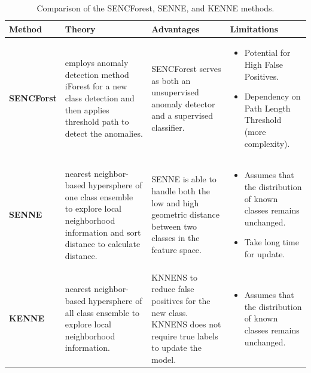 \begin{table}[!ht]

    \centering
    \caption{Comparison of the SENCForest, SENNE, and KENNE methods.}
    \label{table:emerging}
    \small %
    \renewcommand{\arraystretch}{1} %
    \setlength{\tabcolsep}{4pt} %
    \setlength{\arrayrulewidth}{0.15mm}
    \begin{tabularx}{\textwidth}{|>{\centering\arraybackslash\bfseries}p{2cm}|
                                       >{\raggedright\arraybackslash}X|
                                       >{\raggedright\arraybackslash}X|
                                       >{\raggedright\arraybackslash}X|}
    \hline
    \textbf{Method} & \textbf{Theory} & \textbf{Advantages} & \textbf{Limitations} \\ 
    \hline
    \textbf{SENCForst} & 
    employs anomaly detection method iForest \cite{wang2010negative} for a new class detection and then applies threshold path to detect the anomalies. & 
    SENCForest serves as both an unsupervised anomaly detector and a supervised classifier.&
    \begin{itemize}[leftmargin=*]
        \item Potential for High False Positives.
        \item Dependency on Path Length Threshold (more complexity).
    \end{itemize} \\ 
    \hline
    \textbf{SENNE} & 
    nearest neighbor-based hypersphere of one class ensemble to explore local neighborhood information and sort distance to calculate distance. & 
    SENNE is able to handle both the low and high geometric distance between two classes in the feature space. & 
    \begin{itemize}[leftmargin=*]
        \item Assumes that the distribution of known classes remains unchanged.
        \item Take long time for update.
    \end{itemize} \\ 
    \hline
    \textbf{KENNE} & 
    nearest neighbor-based hypersphere of all class ensemble to explore local neighborhood information. & 
    KNNENS to reduce false positives for the new class. KNNENS does not require true labels to update the model. & 
    \begin{itemize}[leftmargin=*]
        \item Assumes that the distribution of known classes remains unchanged.
    \end{itemize} \\
    \hline
    \end{tabularx}
    \end{table}













